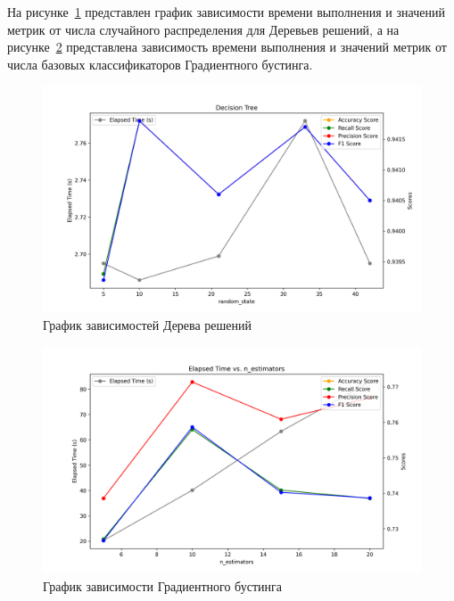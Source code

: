 \newpage
\noindent {}
\label{sec:graphics}

На рисунке~\ref{ris:tree-graph} представлен график зависимости времени выполнения и значений метрик от числа случайного распределения для Деревьев решений, а на рисунке~\ref{ris:boost-graph} представлена зависимость времени выполнения и значений метрик от числа базовых классификаторов Градиентного бустинга.

\begin{figure}[H]
    \centering
    \includegraphics[width=0.9\linewidth]{pic/statistic/decision_tree.png}
    \vspace{0.2em}\caption{График зависимостей Дерева решений}
    \label{ris:tree-graph}
\end{figure}

\begin{figure}[H]
    \centering
    \includegraphics[width=0.9\linewidth]{pic/statistic/gradient_boosting.png}
    \vspace{0.2em}\caption{График зависимости Градиентного бустинга}
    \label{ris:boost-graph}
\end{figure}
\vspace{1em}

